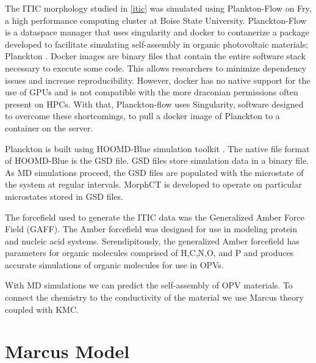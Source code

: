 The ITIC morphology studied in \autoref{itic} was simulated using Plankton-Flow \cite{cmelab} on Fry, 
a high performance computing cluster at Boise State University. 
Planckton-Flow is a dataspace manager that uses
singularity \cite{singularity2017} and docker \cite{Merkel:2014:DLL:2600239.2600241} 
to contanerize a package developed to facilitate simulating self-assembly in
organic photovoltaic materials; Planckton \cite{cmelab}. Docker images are binary files that contain the
entire software stack necessary to execute some code. This allows researchers to minimize dependency issues
and increase reproducibility. However, docker has no native support for the use of GPUs and is not
compatible with the more draconian permissions often present on HPCs. With that, Planckton-flow uses 
Singularity, software designed to overcome these shortcomings,
to pull a docker image of Planckton to a container on the server. 

Planckton is built using HOOMD-Blue simulation toolkit \cite{Anderson2020a}.
The native file format of HOOMD-Blue is the GSD file. GSD files store simulation data in a binary file. As MD
simulations proceed, the GSD files are populated with the microstate of the system at regular intervals.
MorphCT is developed to operate on particular microstates stored in GSD files.

The forcefield used to generate the ITIC data was the Generalized
Amber Force Field (GAFF)\cite{Wang2004a}.
The Amber forcefield was designed for use in modeling protein and
nucleic acid systems. Serendipitously, the generalized Amber forcefield has parameters for organic molecules
comprised of H,C,N,O, and P and produces accurate simulations of organic molecules for use in OPVs. 

With MD simulations we can predict the self-assembly of OPV materials. To connect the chemistry to the
conductivity of the material we use Marcus theory coupled with KMC.

\section{Marcus Model}
\label{marcusmodel}

